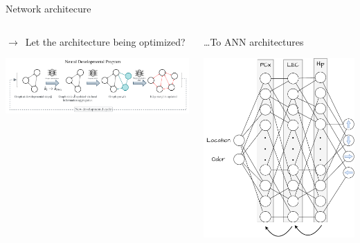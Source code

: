 \documentclass[bigger]{beamer}
\begin{document}
\begin{frame}[label={sec:orgf2cd624}]{Network architecure}
\begin{columns}
\begin{column}{0.5\columnwidth}
\begin{center}
    $\rightarrow$~Let the architecture being optimized?
\end{center}
\begin{center}
\includegraphics[width=\textwidth]{img/neural-dev-program.png}
\end{center}
\end{column}
\begin{column}{0.5\columnwidth}
\begin{center}
    \dots{}To ANN architectures
\end{center}
\begin{center}
\includegraphics[height=0.4\textheight]{img/nn-architecture-fully-connected.drawio.pdf}

\end{center}
\end{column}
\end{columns}
\end{frame}
\end{document}
